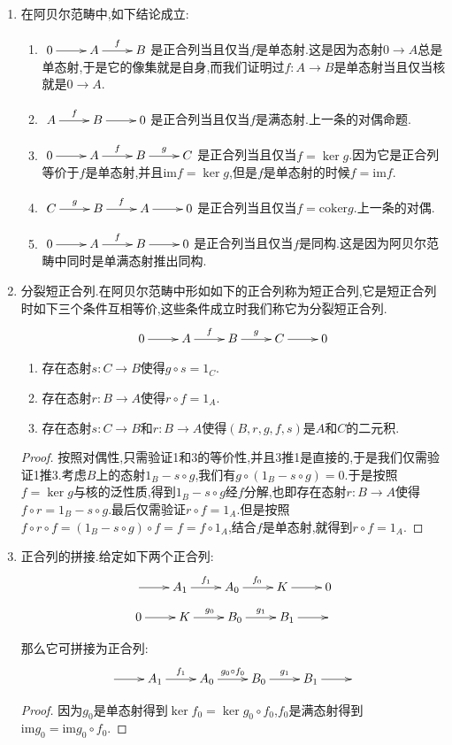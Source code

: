\begin{enumerate}
\begin{proof}
		从$\ker g=\mathrm{im}f=\ker\mathrm{coker}f$得到$\mathrm{coim}g=\mathrm{coker}\ker g=\mathrm{coker}\ker\mathrm{coker}f=\mathrm{coker}f$,取对偶,得到$\mathrm{im}g^*=\ker f^*$.
	\end{proof}
    \item 在阿贝尔范畴中,如下结论成立:
    \begin{enumerate}
    	\item $\xymatrix{0\ar[r]&A\ar[r]^f&B}$是正合列当且仅当$f$是单态射.这是因为态射$0\to A$总是单态射,于是它的像集就是自身,而我们证明过$f:A\to B$是单态射当且仅当核就是$0\to A$.
    	\item $\xymatrix{A\ar[r]^f&B\ar[r]&0}$是正合列当且仅当$f$是满态射.上一条的对偶命题.
    	\item $\xymatrix{0\ar[r]&A\ar[r]^f&B\ar[r]^g&C}$是正合列当且仅当$f=\ker g$.因为它是正合列等价于$f$是单态射,并且$\mathrm{im}f=\ker g$,但是$f$是单态射的时候$f=\mathrm{im}f$.
    	\item $\xymatrix{C\ar[r]^g&B\ar[r]^f&A\ar[r]&0}$是正合列当且仅当$f=\mathrm{coker}g$.上一条的对偶.
    	\item $\xymatrix{0\ar[r]&A\ar[r]^f&B\ar[r]&0}$是正合列当且仅当$f$是同构.这是因为阿贝尔范畴中同时是单满态射推出同构.
    \end{enumerate}
    \item 分裂短正合列.在阿贝尔范畴中形如如下的正合列称为短正合列,它是短正合列时如下三个条件互相等价,这些条件成立时我们称它为分裂短正合列.
    $$\xymatrix{0\ar[r]&A\ar[r]^f&B\ar[r]^g&C\ar[r]&0}$$
    \begin{enumerate}
    	\item 存在态射$s:C\to B$使得$g\circ s=1_C$.
    	\item 存在态射$r:B\to A$使得$r\circ f=1_A$.
    	\item 存在态射$s:C\to B$和$r:B\to A$使得$(B,r,g,f,s)$是$A$和$C$的二元积.
    \end{enumerate}
    \begin{proof}
    	
    	按照对偶性,只需验证1和3的等价性,并且3推1是直接的,于是我们仅需验证1推3.考虑$B$上的态射$1_B-s\circ g$,我们有$g\circ(1_B-s\circ g)=0$.于是按照$f=\ker g$与核的泛性质,得到$1_B-s\circ g$经$f$分解,也即存在态射$r:B\to A$使得$f\circ r=1_B-s\circ g$.最后仅需验证$r\circ f=1_A$.但是按照$f\circ r\circ f=(1_B-s\circ g)\circ f=f=f\circ 1_A$,结合$f$是单态射,就得到$r\circ f=1_A$.
    \end{proof}
    \item 正合列的拼接.给定如下两个正合列:
    $$\xymatrix{\ar[r]&A_1\ar[r]^{f_1}&A_0\ar[r]^{f_0}&K\ar[r]&0}$$
    $$\xymatrix{0\ar[r]&K\ar[r]^{g_0}&B_0\ar[r]^{g_1}&B_1\ar[r]&}$$
    
    那么它可拼接为正合列:
    $$\xymatrix{\ar[r]&A_1\ar[r]^{f_1}&A_0\ar[r]^{g_0\circ f_0}&B_0\ar[r]^{g_1}&B_1\ar[r]&}$$
    \begin{proof}
    	
    	因为$g_0$是单态射得到$\ker f_0=\ker g_0\circ f_0$,$f_0$是满态射得到$\mathrm{im}g_0=\mathrm{im}g_0\circ f_0$.
    \end{proof}
\end{enumerate}

